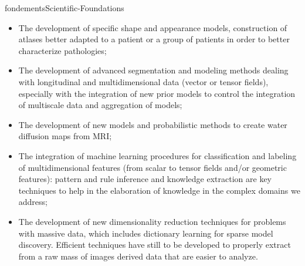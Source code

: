 \documentclass{ra2018}
\begin{document}
\begin{module}{fondements}{Scientific-Foundations}{}
        \begin{itemize}
          \item The development of specific shape and appearance models, construction
          of atlases better adapted to a patient or a group of patients in order to
          better characterize pathologies;
          \item The development of advanced segmentation and modeling methods dealing
          with longitudinal and multidimensional data (vector or tensor fields),
          especially with the integration of new prior models to control the
          integration of multiscale data and aggregation of models;
          \item The development of new models and probabilistic methods to create water
          diffusion maps from MRI;
          \item The integration of machine learning procedures for classification and
          labeling of multidimensional features (from scalar to tensor fields and/or
          geometric features): pattern and rule inference and knowledge extraction are
          key techniques to help in the elaboration of knowledge in the complex domains
          we address;
          \item The development of new dimensionality reduction techniques for problems
          with massive data, which includes dictionary learning for sparse model
          discovery. Efficient techniques have still to be developed to properly
          extract from a raw mass of images derived data that are easier to analyze.
        \end{itemize}
        \end{module}





  



\end{document}
